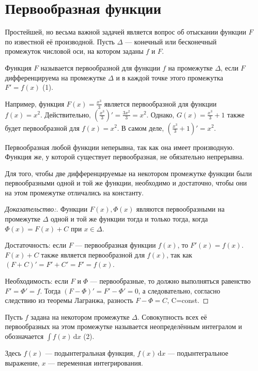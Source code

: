 

	\section*{Первообразная функции}
	Простейшей, но весьма важной задачей является вопрос об отыскании функции
	$F$ по известной её производной. Пусть $\Delta$ --- конечный или бесконечный
	промежуток числовой оси, на котором заданы $f$ и $F$.
	\begin{Def}
	Функция $F$ называется первообразной для функции $f$ на промежутке $\Delta$,
	если $F$ дифференцируема на промежутке $\Delta$ и в каждой точке этого промежутка
	$F'=f(x)$ (1).
	\end{Def}
	Например, функция $F(x)=\frac{x^3}{3}$ является первообразной для функции $f(x)=x^2$.
	Действительно, $\left(\frac{x^3}{3}\right)'=\frac{3x^2}{3}=x^2$. 
	Однако, $G(x)=\frac{x^3}{3}+1$ также будет первообразной для $f(x)=x^2$. 
	В самом деле, $\left(\frac{x^3}{3}+1\right)'=x^2$. 
	
	Первообразная любой функции неперывна, так как она имеет производную. 
	Функция же, у которой существует первообразная, не обязательно непрерывна.
	\begin{Lemma}
		Для того, чтобы две дифференцируемые на некотором промежутке функции были
		первообразными одной и той же функции, необходимо и достаточно, чтобы они
		на этом промежутке отличались на константу.
	\end{Lemma}
\begin{proof}[Доказательство:]
	Функции $F(x), \Phi(x)$ являются первообразными на промежутке $\Delta$ одной
	и той же функции тогда и только тогда, когда $\Phi(x)=F(x)+C$ при $x\in \Delta$.
	
	Достаточность: если $F$ --- первообразная функции $f(x)$, то $F'(x)=f(x)$.
	$F(x)+C$ также является первообразной для $f(x)$, так как $(F+C)'=F'+C'=F'=f(x)$.
	
	Необходимость: если $F$ и $\Phi$ --- первообразные, то должно выполняться
	равенство $F'=\Phi'=f$. Тогда $(F-\Phi)'=F'-\Phi'=0$, а следовательно, 
	согласно следствию	из теоремы Лагранжа, разность $F-\Phi=C$, C=const.
\end{proof}
\begin{Def}
	Пусть $f$ задана на некотором промежутке $\Delta$.
	Совокупность всех её первообразных на этом промежутке называется 
	неопределённым	интегралом и обозначается $\int f(x)\,\mathrm{d}x$ (2).
\end{Def}
Здесь $f(x)$ --- подынтегральная функция, $f(x)\,\mathrm{d}x$ --- 
подынтегральное выражение, $x$ --- переменная интегрирования.

